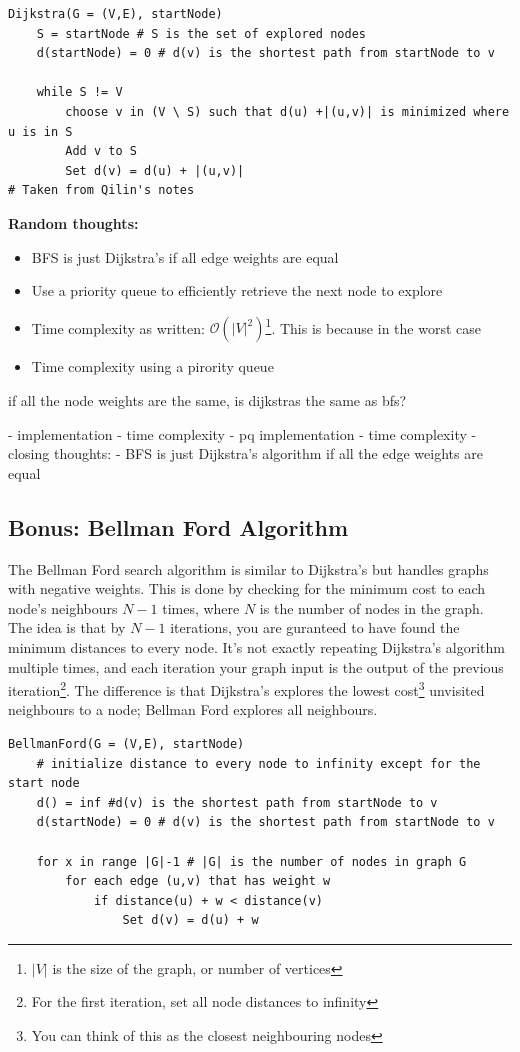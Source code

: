 \documentclass{tufte-handout}
\begin{document}
\begin{lstlisting}
Dijkstra(G = (V,E), startNode)
    S = startNode # S is the set of explored nodes
    d(startNode) = 0 # d(v) is the shortest path from startNode to v

    while S != V
        choose v in (V \ S) such that d(u) +|(u,v)| is minimized where u is in S
        Add v to S
        Set d(v) = d(u) + |(u,v)|
# Taken from Qilin's notes
\end{lstlisting}

\textbf{Random thoughts:} \\
\begin{itemize}
\item BFS is just Dijkstra's if all edge weights are equal
\item Use a priority queue to efficiently retrieve the next node to explore
\item Time complexity as written: $\mathcal{O}(|V|^2)$\footnote{$|V|$
    is the size of the graph, or number of vertices}. This is
  because in the worst case
\item Time complexity using a pirority queue
\end{itemize}
if all the node weights are the same, is dijkstras the same as bfs?

- implementation
- time complexity
- pq implementation
- time complexity
-
closing thoughts:
- BFS is just Dijkstra's algorithm if all the edge weights are equal

\color{pinkishpurple}
\subsection{Bonus: Bellman Ford Algorithm}
The Bellman Ford search algorithm is similar to Dijkstra's but handles
graphs with negative weights. This is done by checking for the minimum
cost to each node's neighbours $N-1$ times, where $N$ is the number of
nodes in the graph. The idea is that by $N-1$ iterations, you are
guranteed to have found the minimum distances to every node. It's not
exactly repeating Dijkstra's algorithm multiple
times, and each iteration your graph input is the output of the previous
iteration\footnote{For the first iteration, set all node distances to
infinity}. The difference is that Dijkstra's explores the lowest cost\footnote{You can think of this as the closest neighbouring nodes}
unvisited neighbours to a node; Bellman Ford explores all neighbours.

\begin{lstlisting}
BellmanFord(G = (V,E), startNode)
    # initialize distance to every node to infinity except for the start node
    d() = inf #d(v) is the shortest path from startNode to v
    d(startNode) = 0 # d(v) is the shortest path from startNode to v

    for x in range |G|-1 # |G| is the number of nodes in graph G
        for each edge (u,v) that has weight w
            if distance(u) + w < distance(v)
                Set d(v) = d(u) + w
\end{lstlisting}
\end{document}
